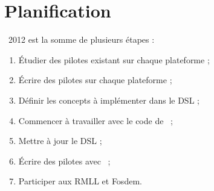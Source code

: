 \documentclass[chapterprefix=off]{rtxreport}
\begin{document}
\section{Planification}

\rtx\ 2012 est la somme de plusieurs étapes :

\begin{enumerate}
\item Étudier des pilotes existant sur chaque plateforme ;
\item Écrire des pilotes sur chaque plateforme ;
\item Définir les concepts à implémenter dans le DSL ;
\item Commencer \`a travailler avec le code de \rtx\ ;
\item Mettre \`a jour le DSL ;
\item Écrire des pilotes avec \rtx\ ;
\item Participer aux RMLL et Fosdem.
\end{enumerate}


\rtxbibliography
\end{document}
